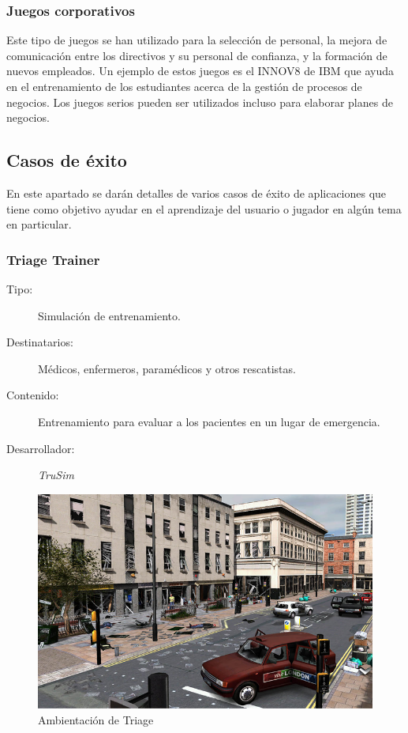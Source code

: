 \subsubsection{Juegos corporativos}

Este tipo de juegos se han utilizado para la selección de personal, la mejora de
comunicación entre los directivos y su personal de confianza, y la formación de
nuevos empleados. Un ejemplo de estos juegos es el INNOV8 de IBM que ayuda en el
entrenamiento de los estudiantes acerca de la gestión de procesos de negocios.
Los juegos serios pueden ser utilizados incluso para elaborar planes de
negocios\cite{education:games}. 

\subsection{Casos de éxito}

En este apartado se darán detalles de varios casos de éxito de aplicaciones que
tiene  como objetivo ayudar en el aprendizaje del usuario o jugador en algún
tema en particular.

\subsubsection{Triage Trainer}
	

\begin{description}
\item[Tipo:] Simulación de entrenamiento.
\item[Destinatarios:] Médicos, enfermeros, paramédicos y otros rescatistas.
\item[Contenido:] Entrenamiento para evaluar a los pacientes en un lugar de
  emergencia.
\item[Desarrollador:] \emph{TruSim}
\end{description}

\begin{figure}[ht!] 
\centering 
\includegraphics[scale=0.5]{tics/images/triage.png}
\caption{Ambientación de Triage}
\label{fig:triage}
\end{figure}

